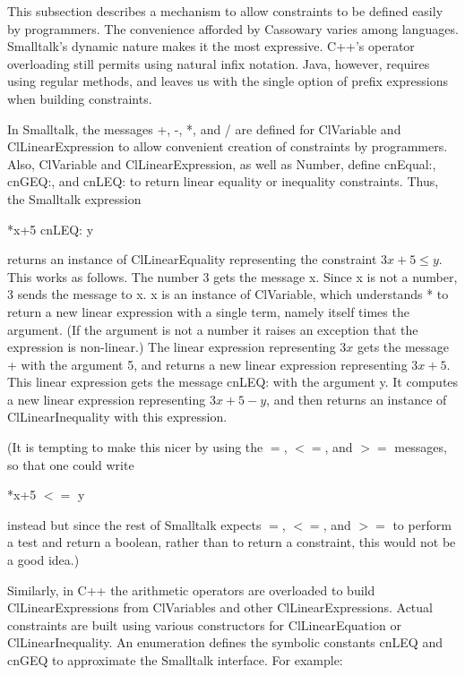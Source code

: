 \documentclass{article}
\begin{document}
This subsection describes a mechanism to allow constraints to be defined
easily by programmers.  The convenience afforded by Cassowary varies
among languages.  Smalltalk's dynamic nature makes it the most
expressive.  C++'s operator overloading still permits using natural
infix notation.  Java, however, requires using regular methods, and
leaves us with the single option of prefix expressions when building
constraints.

In Smalltalk, the messages +, -, *, and / are defined for {\sf
  ClVariable} and {\sf ClLinearExpression} to allow convenient creation
of constraints by programmers.  Also, {\sf ClVariable} and {\sf
  ClLinearExpression}, as well as {\sf Number}, define {\sf cnEqual:},
{\sf cnGEQ:}, and {\sf cnLEQ:} to return linear equality or inequality
constraints.  Thus, the Smalltalk expression

\hspace*{1cm} {*x+5 cnLEQ: y}

returns an instance of {\sf ClLinearEquality} representing the
constraint $3 x + 5 \leq y$.  This works as follows.  The number 3 gets
the message {\sf * x}.  Since {\sf x} is not a number, 3 sends the
message {} to {\sf x}.  {\sf x} is an instance of {\sf
  ClVariable}, which understands * to return a new linear expression
with a single term, namely itself times the argument.  (If the argument
is not a number it raises an exception that the expression is
non-linear.)  The linear expression representing $3x$ gets the message +
with the argument 5, and returns a new linear expression representing $3
x + 5$.  This linear expression gets the message {\sf cnLEQ:} with the
argument {\sf y}.  It computes a new linear expression representing $3 x
+ 5 - y$, and then returns an instance of {\sf ClLinearInequality} with
this expression.

(It is tempting to make this nicer by using the $=$, $<=$, and $>=$
messages, so that one could write

\hspace*{1 cm} {*x+5 $<=$ y}

instead but since the rest of Smalltalk expects $=$, $<=$, and $>=$ to
perform a test and return a boolean, rather than to return a constraint,
this would not be a good idea.)

Similarly, in C++ the arithmetic operators are overloaded to build {\sf
  ClLinearExpression}s from {\sf ClVariable}s and other {\sf
  ClLinearExpression}s.  Actual constraints are built using various
constructors for {\sf ClLinearEquation} or {\sf ClLinearInequality}.  An
enumeration defines the symbolic constants {\sf cnLEQ} and {\sf cnGEQ}
to approximate the Smalltalk interface.  For example:
\end{document}
